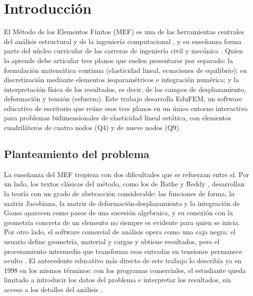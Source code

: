 \chapter*{Introducción}

El Método de los Elementos Finitos (MEF) es una de las herramientas centrales del análisis estructural y de la ingeniería computacional \autocite{zienkiewicz2013fem,cook2002concepts}, y su enseñanza forma parte del núcleo curricular de las carreras de ingeniería civil y mecánica \autocite[p.~1160]{perezsantiago2023fem}. Quien lo aprende debe articular tres planos que suelen presentarse por separado: la formulación matemática continua (elasticidad lineal, ecuaciones de equilibrio); su discretización mediante elementos isoparamétricos e integración numérica; y la interpretación física de los resultados, es decir, de los campos de desplazamiento, deformación y tensión (esfuerzo). Este trabajo desarrolla EduFEM, un software educativo de escritorio que reúne esos tres planos en un único entorno interactivo para problemas bidimensionales de elasticidad lineal estática, con elementos cuadriláteros de cuatro nodos (Q4) y de nueve nodos (Q9).

\section*{Planteamiento del problema}

La enseñanza del MEF tropieza con dos dificultades que se refuerzan entre sí. Por un lado, los textos clásicos del método, como los de Bathe y Reddy \autocite{bathe2014fem,reddy2006introduction}, desarrollan la teoría con un grado de abstracción considerable: las funciones de forma, la matriz Jacobiana, la matriz de deformación-desplazamiento y la integración de Gauss aparecen como pasos de una sucesión algebraica, y su conexión con la geometría concreta de un elemento no siempre es evidente para quien se inicia. Por otro lado, el software comercial de análisis opera como una caja negra: el usuario define geometría, material y cargas y obtiene resultados, pero el procesamiento intermedio que transforma esas entradas en tensiones permanece oculto \autocite[p.~1160]{perezsantiago2023fem}. El antecedente educativo más directo de este trabajo lo describía ya en 1998 en los mismos términos: con los programas comerciales, el estudiante queda limitado a introducir los datos del problema e interpretar los resultados, sin acceso a los detalles del análisis \autocite[p.~246]{suarez1998edelas2d}.

